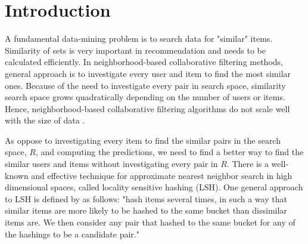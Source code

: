\documentclass[conference]{IEEEtran}
\begin{document}





%
\IEEEpeerreviewmaketitle


\section{Introduction}

A fundamental data-mining problem is to search data for "similar" items. 
Similarity of sets is very important in recommendation and needs to be
calculated efficiently. In neighborhood-based collaborative filtering methods, 
general approach is to investigate every user and item to find the most similar 
ones. Because of the need to investigate every pair in search space, similarity 
search space grows quadratically depending on the number of users or items. 
Hence, neighborhood-based collaborative filtering algorithms do not scale well 
with the size of data \cite {DBLP:reference/rsh/DesrosiersK11}.

As oppose to investigating every item to find the similar pairs in the 
search space, $R$, and computing the predictions, we need to find a better 
way to find the similar users and items without investigating every pair in $R$. 
There is a well-known and effective technique for approximate nearest neighbor 
search in high dimensional spaces, called locality sensitive hashing (LSH). 
One general approach to LSH is defined by \cite{Rajaraman:2011:MMD:2124405} 
as follows: "hash items several times, in such a way that similar items are 
more likely to be hashed to the same bucket than dissimilar items are. We then 
consider any pair that hashed to the same bucket for any of the hashings to be 
a candidate pair." 
\end{document}

